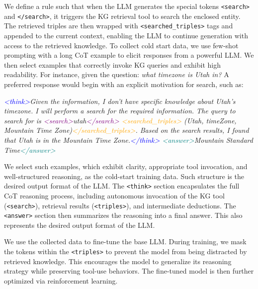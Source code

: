 \documentclass[10pt,conference]{IEEEtran}
\begin{document}
We define a rule such that when the LLM generates the special tokens \texttt{<search>} and \texttt{</search>}, it triggers the KG retrieval tool to search the enclosed entity. The retrieved triples are then wrapped with \texttt{<searched\_triples>} tags and appended to the current context, enabling the LLM to continue generation with access to the retrieved knowledge.
To collect cold start data, we use few-shot prompting with a long CoT example to elicit responses from a powerful LLM. We then select examples that correctly invoke KG queries and exhibit high readability. 
For instance, given the question:
\textit{what timezone is Utah in?}
A preferred response would begin with an explicit motivation for search, such as:

\textit{\textcolor{blue}{<think>}Given the information, I don't have specific knowledge about Utah's timezone. I will perform a search for the required information. The query to search for is \textcolor{purple}{<search>}utah\textcolor{purple}{</search>} \textcolor{orange}{<searched\_triples>} (Utah, timeZone, Mountain Time Zone)\textcolor{orange}{</searched\_triples>}. Based on the search results, I found that Utah is in the Mountain Time Zone.\textcolor{blue}{</think>} \textcolor{teal}{<answer>}Mountain Standard Time\textcolor{teal}{</answer>}}

We select such examples, which exhibit clarity, appropriate tool invocation, and well-structured reasoning, as the cold-start training data. Such structure is the desired output format of the LLM. The \texttt{<think>} section encapsulates the full CoT reasoning process, including autonomous invocation of the KG tool (\texttt{<search>}), retrieval results (\texttt{<triples>}), and intermediate deductions. The \texttt{<answer>} section then summarizes the reasoning into a final answer. This also represents the desired output format of the LLM. 

We use the collected data to fine-tune the base LLM. During training, we mask the tokens within the \texttt{<triples>} to prevent the model from being distracted by retrieved knowledge. This encourages the model to generalize its reasoning strategy while preserving tool-use behaviors. The fine-tuned model is then further optimized via reinforcement learning.
\end{document}

